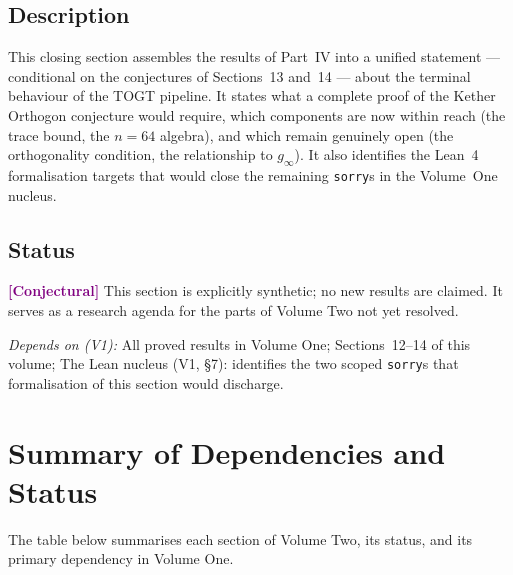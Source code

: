 \documentclass[11pt]{article}
\newcommand{\conjectural}{\textcolor{purple}{\textbf{[Conjectural]}}}
\newcommand{\depends}[1]{\smallskip\noindent\textit{Depends on (V1):} #1.\smallskip}
\begin{document}
\subsection*{Description}
This closing section assembles the results of Part~IV into a unified
statement --- conditional on the conjectures of Sections~13 and~14 --- about
the terminal behaviour of the TOGT pipeline. It states what a complete
proof of the Kether Orthogon conjecture would require, which components
are now within reach (the trace bound, the $n = 64$ algebra), and which
remain genuinely open (the orthogonality condition, the relationship to
$g_\infty$). It also identifies the Lean~4 formalisation targets that
would close the remaining \texttt{sorry}s in the Volume~One nucleus.

\subsection*{Status}
\conjectural{} This section is explicitly synthetic; no new results are
claimed. It serves as a research agenda for the parts of Volume Two not
yet resolved.

\depends{All proved results in Volume One;
Sections~12--14 of this volume;
The Lean nucleus (V1, \S7): identifies the two scoped \texttt{sorry}s
that formalisation of this section would discharge}

\section*{Summary of Dependencies and Status}

The table below summarises each section of Volume Two, its status, and
its primary dependency in Volume One.
\end{document}
